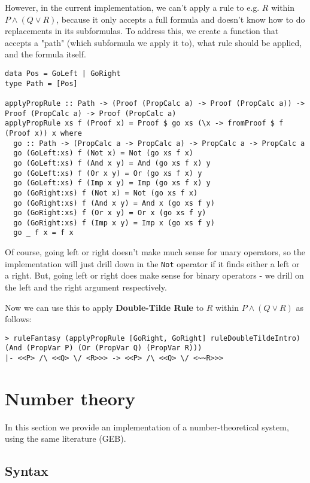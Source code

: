\documentclass{article}
\begin{document}
However, in the current implementation, we can't apply a rule to e.g. $R$ within $P \land (Q \lor R)$, because it only accepts a full formula and doesn't know how to do replacements in its subformulas. To address this, we create a function that accepts a "path" (which subformula we apply it to), what rule should be applied, and the formula itself.

\begin{lstlisting}
data Pos = GoLeft | GoRight
type Path = [Pos]

applyPropRule :: Path -> (Proof (PropCalc a) -> Proof (PropCalc a)) -> Proof (PropCalc a) -> Proof (PropCalc a)
applyPropRule xs f (Proof x) = Proof $ go xs (\x -> fromProof $ f (Proof x)) x where
  go :: Path -> (PropCalc a -> PropCalc a) -> PropCalc a -> PropCalc a
  go (GoLeft:xs) f (Not x) = Not (go xs f x)
  go (GoLeft:xs) f (And x y) = And (go xs f x) y
  go (GoLeft:xs) f (Or x y) = Or (go xs f x) y
  go (GoLeft:xs) f (Imp x y) = Imp (go xs f x) y
  go (GoRight:xs) f (Not x) = Not (go xs f x)
  go (GoRight:xs) f (And x y) = And x (go xs f y)
  go (GoRight:xs) f (Or x y) = Or x (go xs f y)
  go (GoRight:xs) f (Imp x y) = Imp x (go xs f y)
  go _ f x = f x
\end{lstlisting}

Of course, going left or right doesn't make much sense for unary operators, so the implementation will just drill down in the \texttt{Not} operator if it finds either a left or a right. But, going left or right does make sense for binary operators - we drill on the left and the right argument respectively.

Now we can use this to apply \textbf{Double-Tilde Rule} to $R$ within $P \land (Q \lor R)$ as follows:

\begin{lstlisting}
> ruleFantasy (applyPropRule [GoRight, GoRight] ruleDoubleTildeIntro) (And (PropVar P) (Or (PropVar Q) (PropVar R)))
|- <<P> /\ <<Q> \/ <R>>> -> <<P> /\ <<Q> \/ <~~R>>>
\end{lstlisting}

\section{Number theory}

In this section we provide an implementation of a number-theoretical system, using the same literature (GEB).

\subsection{Syntax}
\end{document}
